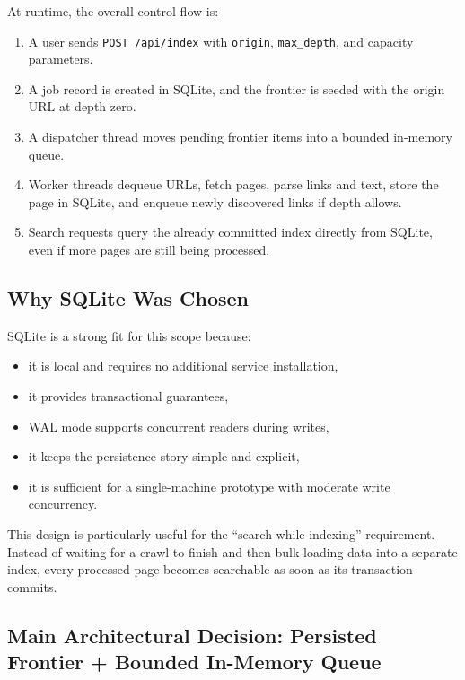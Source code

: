 \documentclass[pdftex,12pt,a4paper]{article}
\begin{document}
At runtime, the overall control flow is:

\begin{enumerate}
    \item A user sends \texttt{POST /api/index} with \texttt{origin}, \texttt{max\_depth}, and capacity parameters.
    \item A job record is created in SQLite, and the frontier is seeded with the origin URL at depth zero.
    \item A dispatcher thread moves pending frontier items into a bounded in-memory queue.
    \item Worker threads dequeue URLs, fetch pages, parse links and text, store the page in SQLite, and enqueue newly discovered links if depth allows.
    \item Search requests query the already committed index directly from SQLite, even if more pages are still being processed.
\end{enumerate}

\subsection{Why SQLite Was Chosen}

SQLite is a strong fit for this scope because:

\begin{itemize}
    \item it is local and requires no additional service installation,
    \item it provides transactional guarantees,
    \item WAL mode supports concurrent readers during writes,
    \item it keeps the persistence story simple and explicit,
    \item it is sufficient for a single-machine prototype with moderate write concurrency.
\end{itemize}

This design is particularly useful for the ``search while indexing'' requirement. Instead of waiting for a crawl to finish and then bulk-loading data into a separate index, every processed page becomes searchable as soon as its transaction commits.

\subsection{Main Architectural Decision: Persisted Frontier + Bounded In-Memory Queue}
\end{document}
